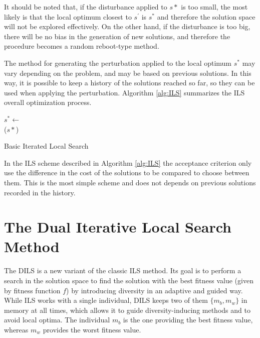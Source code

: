 It should be noted that, if the disturbance applied to $s*$ is too small, the most likely is that the local optimum closest to $s^\prime$ is $s^*$ and therefore the solution space will not be explored effectively. On the other hand, if the disturbance is too big, there will be no bias in the generation of new solutions, and therefore the procedure becomes a random reboot-type method.


The method for generating the perturbation applied to the local optimum $s^*$ may vary depending on the problem, and may be based on previous solutions. In this way, it is possible to keep a history of the solutions reached so far, so they can be used when applying the perturbation. Algorithm \ref{alg:ILS} summarizes the \acs{ILS} overall optimization process.

\begin{algorithm}
	\SetNlSkip{0.5em}
	\BlankLine
	$s^* \leftarrow$ \\
	\BlankLine
	\KwRet ($s*$)
	
	\caption{Basic Iterated Local Search}\label{alg:ILS}
\end{algorithm}

In the \acs{ILS} scheme described in Algorithm \ref{alg:ILS} the acceptance criterion only use the difference in the cost of the solutions to be compared to choose between them. This is the most simple scheme and does not depends on previous solutions recorded in the history.

\section{The Dual Iterative Local Search Method}

The \acf{DILS} is a new variant of the classic \acs{ILS} method. Its goal is to perform a search in the solution space to find the solution with the best fitness value (given by fitness function $f$) by introducing diversity in an adaptive and guided way. While \acs{ILS} works with a single individual, \acs{DILS} keeps two of them $\{m_b, m_w\}$ in memory at all times, which allows it to guide diversity-inducing methods and to avoid local optima. The individual $m_b$ is the one providing the best fitness value, whereas $m_w$ provides the worst fitness value.

